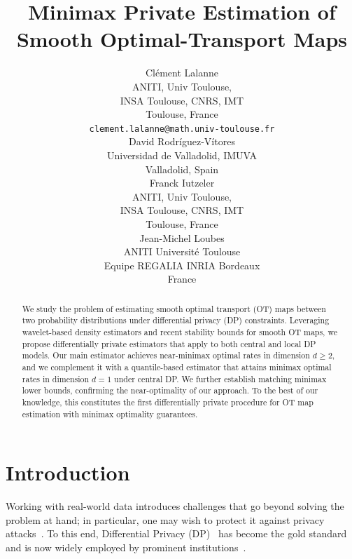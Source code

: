 \documentclass{article}
\title{Minimax Private Estimation of Smooth Optimal-Transport Maps}
\author{%
  Clément Lalanne \\
  ANITI, Univ Toulouse, \\INSA Toulouse, CNRS, IMT\\
  Toulouse, France \\
  \texttt{clement.lalanne@math.univ-toulouse.fr} \\
  \And
  David Rodríguez-Vítores \\
  Universidad de Valladolid, IMUVA \\
  Valladolid, Spain \\
  \And
  Franck Iutzeler \\
  ANITI, Univ Toulouse, \\INSA Toulouse, CNRS, IMT\\
  Toulouse, France \\
  \And
  Jean-Michel Loubes \\
  ANITI Université Toulouse \\ Equipe REGALIA INRIA Bordeaux \\ France \\
}
\newcommand{\1}{\mathds{1}}
\theoremstyle{plain}
\theoremstyle{definition}
\theoremstyle{remark}
\begin{document}
\maketitle


\begin{abstract}
  We study the problem of estimating smooth optimal transport (OT) maps between two probability distributions under differential privacy (DP) constraints. Leveraging wavelet-based density estimators and recent stability bounds for smooth OT maps, we propose differentially private estimators that apply to both central and local DP models. Our main estimator achieves near-minimax optimal rates in dimension $d \geq 2$, and we complement it with a quantile-based estimator that attains minimax optimal rates in dimension $d=1$ under central DP. We further establish matching minimax lower bounds, confirming the near-optimality of our approach. To the best of our knowledge, this constitutes the first differentially private procedure for OT map estimation with minimax optimality guarantees.
\end{abstract}



\section{Introduction}

Working with real-world data introduces challenges that go beyond solving the problem at hand; in particular, one may wish to protect it against privacy attacks~\cite{narayanan2006break,backstrom2007wherefore,fredrikson2015model,dinur2003revealing,homer2008resolving,loukides2010disclosure,narayanan2008robust,sweeney2000simple,wagner2018technical,sweeney2002k}. To this end, Differential Privacy (DP)~\cite{dwork2006calibrating} has become the gold standard and is now widely employed by prominent institutions~\cite{abowd2018us,erlingsson2014rappor,thakurta2017learning,ding2017collecting}.
\end{document}

